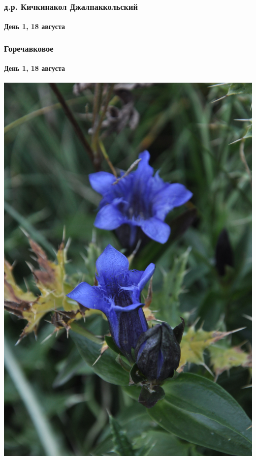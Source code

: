 \begin{frame}
	\frametitle{д.р. Кичкинакол Джалпаккольский}
	\framesubtitle{День 1, 18 августа}
	\centering
\end{frame}

\begin{frame}
	\frametitle{Горечавковое}
	\framesubtitle{День 1, 18 августа}
	\centering
	\includegraphics[width=\linewidth]{../pics/DSC_0585}
\end{frame}